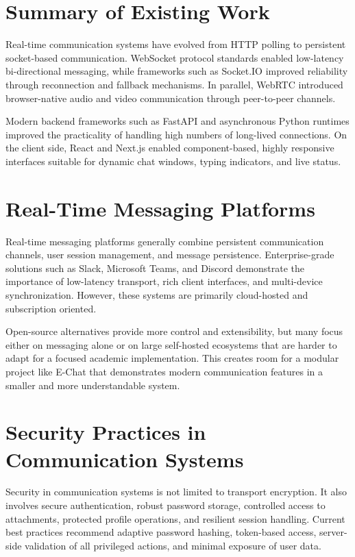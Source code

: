 \documentclass[12pt,a4paper,oneside]{report}
\begin{document}
\section{Summary of Existing Work}
\label{sec:existing-work}

Real-time communication systems have evolved from HTTP polling to persistent
socket-based communication. WebSocket protocol standards enabled low-latency
bi-directional messaging, while frameworks such as Socket.IO improved reliability
through reconnection and fallback mechanisms. In parallel, WebRTC introduced
browser-native audio and video communication through peer-to-peer channels.

Modern backend frameworks such as FastAPI and asynchronous Python runtimes
improved the practicality of handling high numbers of long-lived connections.
On the client side, React and Next.js enabled component-based, highly responsive
interfaces suitable for dynamic chat windows, typing indicators, and live status.

\section{Real-Time Messaging Platforms}
\label{sec:messaging-platforms}
Real-time messaging platforms generally combine persistent communication channels,
user session management, and message persistence. Enterprise-grade solutions such
as Slack, Microsoft Teams, and Discord demonstrate the importance of low-latency
transport, rich client interfaces, and multi-device synchronization. However,
these systems are primarily cloud-hosted and subscription oriented.

Open-source alternatives provide more control and extensibility, but many focus
either on messaging alone or on large self-hosted ecosystems that are harder to
adapt for a focused academic implementation. This creates room for a modular
project like E-Chat that demonstrates modern communication features in a smaller
and more understandable system.

\section{Security Practices in Communication Systems}
\label{sec:security-practices}
Security in communication systems is not limited to transport encryption. It also
involves secure authentication, robust password storage, controlled access to
attachments, protected profile operations, and resilient session handling.
Current best practices recommend adaptive password hashing, token-based access,
server-side validation of all privileged actions, and minimal exposure of user data.
\end{document}
